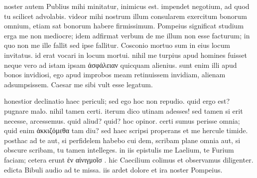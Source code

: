  noster autem Publius mihi minitatur, inimicus est. impendet negotium, ad quod tu scilicet advolabis. videor mihi nostrum illum consularem exercitum bonorum omnium, etiam sat bonorum habere firmissimum. Pompeius significat studium erga me non mediocre; idem adfirmat verbum de me illum non esse facturum; in quo non me ille fallit sed ipse fallitur. Cosconio mortuo sum in eius locum invitatus. id erat vocari in locum mortui. nihil me turpius apud homines fuisset neque vero ad istam ipsam ἀσφάλειαν quicquam alienius. sunt enim illi apud bonos invidiosi, ego apud improbos meam retinuissem invidiam, alienam adsumpsissem. Caesar me sibi vult esse legatum.

 honestior declinatio haec periculi; sed ego hoc non repudio. quid ergo est? pugnare malo. nihil tamen certi. iterum dico utinam adesses! sed tamen si erit necesse, arcessemus. quid aliud? quid? hoc opinor. certi sumus perisse omnia; quid enim ἀκκιζόμεθα tam diu? sed haec scripsi properans et me hercule timide. posthac ad te aut, si perfidelem habebo cui dem, scribam plane omnia aut, si obscure scribam, tu tamen intelleges. in iis epistulis me Laelium, te Furium faciam; cetera erunt ἐν αἰνιγμοῖσ . hic Caecilium colimus et observamus diligenter. edicta Bibuli audio ad te missa. iis ardet dolore et ira noster Pompeius.
